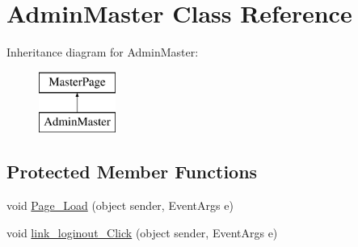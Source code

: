 \hypertarget{class_admin_master}{}\section{Admin\+Master Class Reference}
\label{class_admin_master}
Inheritance diagram for Admin\+Master\+:\begin{figure}[H]
\begin{center}
\leavevmode
\includegraphics[height=2.000000cm]{class_admin_master}
\end{center}
\end{figure}
\subsection*{Protected Member Functions}
\begin{DoxyCompactItemize}
\item 
void \mbox{\hyperlink{class_admin_master_ae919928c9e43d5f5ab5d006afca88d6b}{Page\+\_\+\+Load}} (object sender, Event\+Args e)
\item 
void \mbox{\hyperlink{class_admin_master_ac6ec92f844bb740a14a77e7e0932c15f}{link\+\_\+loginout\+\_\+\+Click}} (object sender, Event\+Args e)
\end{DoxyCompactItemize}
